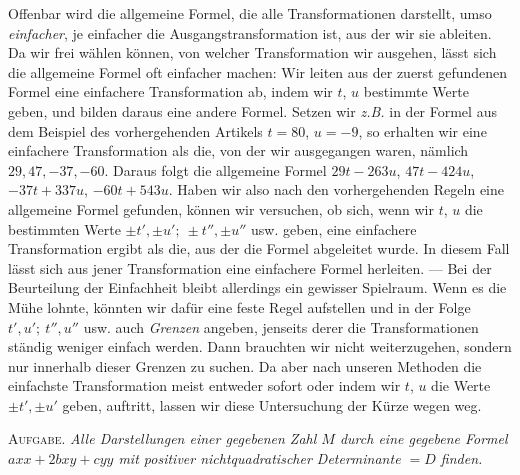 Offenbar wird die allgemeine Formel, die alle Transformationen darstellt, umso \textit{einfacher}, je einfacher die Ausgangstransformation ist, aus der wir sie ableiten. Da wir frei wählen können, von welcher Transformation wir ausgehen, lässt sich die allgemeine Formel oft einfacher machen: Wir leiten aus der zuerst gefundenen Formel eine einfachere Transformation ab, indem wir $t$, $u$ bestimmte Werte geben, und bilden daraus eine andere Formel. Setzen wir \textit{z.B.} in der Formel aus dem Beispiel des vorhergehenden Artikels $t=80$, $u=-9$, so erhalten wir eine einfachere Transformation als die, von der wir ausgegangen waren, nämlich $29,47,-37,-60$. Daraus folgt die allgemeine Formel $29t-263u$, $47t-424u$, $-37t+337u$, $-60t+543u$. Haben wir also nach den vorhergehenden Regeln eine allgemeine Formel gefunden, können wir versuchen, ob sich, wenn wir $t$, $u$ die bestimmten Werte $\pm t',\pm u';\ \pm t'',\pm u''$ usw. geben, eine einfachere Transformation ergibt als die, aus der die Formel abgeleitet wurde. In diesem Fall lässt sich aus jener Transformation eine einfachere Formel herleiten. --- Bei der Beurteilung der Einfachheit bleibt allerdings ein gewisser Spielraum. Wenn es die Mühe lohnte, könnten wir dafür eine feste Regel aufstellen und in der Folge $t',u';\ t'',u''$ usw. auch \textit{Grenzen} angeben, jenseits derer die Transformationen ständig weniger einfach werden. Dann brauchten wir nicht weiterzugehen, sondern nur innerhalb dieser Grenzen zu suchen. Da aber nach unseren Methoden die einfachste Transformation meist entweder sofort oder indem wir $t$, $u$ die Werte $\pm t',\pm u'$ geben, auftritt, lassen wir diese Untersuchung der Kürze wegen weg.

\textsc{Aufgabe.} \textit{Alle Darstellungen einer gegebenen Zahl $M$ durch eine gegebene Formel $axx+2bxy+cyy$ mit positiver nichtquadratischer Determinante $=D$ finden.}

